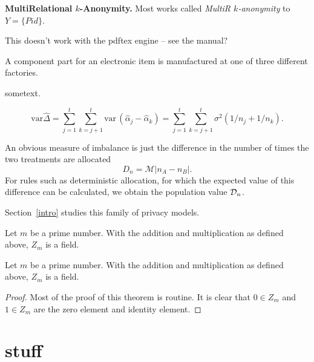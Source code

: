 \textbf{MultiRelational $k$-Anonymity.} Most works called \emph{MultiR $k$-anonymity} to  $Y=\{Pid\}$.



\begin{shadebox} 
This doesn’t work with the pdftex engine -- see the manual?
\end{shadebox}


\begin{extract}
A component part for an electronic item is \cite{hyvarinen2001ica}
manufactured at one of three different factories.
\end{extract}

sometext.

\begin{equation}
\mbox{var}\widehat{\Delta} = \sum_{j = 1}^t \sum_{k = j+1}^t
\mbox{var}\,(\hat{\alpha}_j - \hat{\alpha}_k)  = \sum_{j = 1}^t
\sum_{k = j+1}^t \sigma^2(1/n_j + 1/n_k). \label{2delvart2}
\end{equation}


An obvious measure of imbalance is just the difference in the
number of times the two treatments are allocated
\begin{equation}
D_n = \mathcal{M}|n_A - n_B|. \label{2deffD}
\end{equation}
For rules such as deterministic allocation, for which the expected
value of this difference can be calculated, we obtain the population
value ${\cal D}_n$.

\begin{shortbox}
Section~\ref{intro} studies this family of privacy models.

Let $m$ be a prime number. With the addition and multiplication as
defined above, $Z_m$ is a field.
\end{shortbox}

\begin{theorem}\label{1th:Z_m}
Let $m$ be a prime number. With the addition and multiplication as
defined above, $Z_m$ is a field.
\end{theorem}

\begin{proof}
Most of the proof of this theorem is routine.  It is clear that $0\in Z_m$
and $1\in Z_m$ are the
zero element and identity element. 
\end{proof}



\section{stuff}\label{sec:reclinkage}

